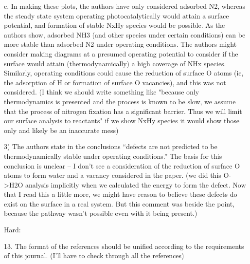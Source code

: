 
c.      In making these plots, the authors have only considered adsorbed N2, whereas the steady state system operating photocatalytically would attain a surface potential, and formation of stable NxHy species would be possible.  As the authors show, adsorbed NH3 (and other species under certain conditions) can be more stable than adsorbed N2 under operating conditions.  The authors might consider making diagrams at a presumed operating potential to consider if the surface would attain (thermodynamically) a high coverage of NHx species.  Similarly, operating conditions could cause the reduction of surface O atoms (ie, the adsorption of H or formation of surface O vacancies), and this was not considered. (I think we should write something like "because only thermodynamics is presented and the process is known to be slow, we assume that the process of nitrogen fixation has a significant barrier. Thus we will limit our surface analysis to reactants" if we show NxHy species it would show those only and likely be an inaccurate mess)


3)      The authors state in the conclusions “defects are not predicted to be thermodynamically stable under operating conditions.”  The basis for this conclusion is unclear – I don’t see a consideration of the reduction of surface O atoms to form water and a vacancy considered in the paper. (we did this O->H2O analysis implicitly when we calculated the energy to form the defect. Now that I read this a little more, we might have reason to believe these defects do exist on the surface in a real system. But this comment was beside the point, because the pathway wasn't possible even with it being present.)


Hard:

13. The format of the references should be unified according to the requirements of this journal. (I'll have to check through all the references)

